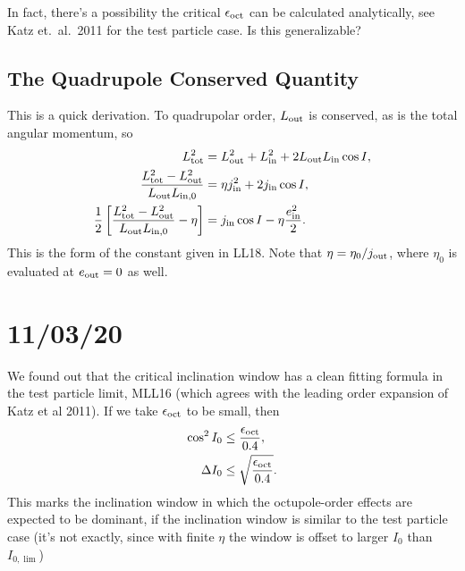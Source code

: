 \documentclass[10pt]{article}%
\newcommand*{\s}[1]{\left[#1\right]}
\begin{document}
In fact, there's a possibility the critical $\epsilon_{\rm oct}$ can be
calculated analytically, see Katz et.\ al.\ 2011 for the test particle case. Is
this generalizable?

\subsection{The Quadrupole Conserved Quantity}

This is a quick derivation. To quadrupolar order, $L_{\rm out}$ is conserved, as
is the total angular momentum, so
\begin{align}
    L_{\rm tot}^2 &= L_{\rm out}^2 + L_{\rm in}^2 + 2L_{\rm out}L_{\rm in}
            \cos I,\\
    \frac{L_{\rm tot}^2 - L_{\rm out}^2}{L_{\rm out}L_{\rm in, 0}} &=
        \eta j_{\rm in}^2 + 2j_{\rm in}\cos I,\\
    \frac{1}{2}\s{\frac{L_{\rm tot}^2 - L_{\rm out}^2}{L_{\rm out}L_{\rm in, 0}}
        - \eta} &= j_{\rm in}\cos I - \eta \frac{e_{\rm in}^2}{2}.
\end{align}
This is the form of the constant given in LL18. Note that $\eta = \eta_0 /
j_{\rm out}$, where $\eta_0$ is evaluated at $e_{\rm out} = 0$ as well.

\section{11/03/20}

We found out that the critical inclination window has a clean fitting formula in
the test particle limit, MLL16 (which agrees with the leading order expansion of
Katz et al 2011). If we take $\epsilon_{\rm oct}$ to be small, then
\begin{align}
    \cos^2 I_0 &\leq \frac{\epsilon_{\rm oct}}{0.4},\\
    \Delta I_0 &\leq \sqrt{\frac{\epsilon_{\rm oct}}{0.4}}.
\end{align}
This marks the inclination window in which the octupole-order effects are
expected to be dominant, if the inclination window is similar to the test
particle case (it's not exactly, since with finite $\eta$ the window is offset
to larger $I_0$ than $I_{0, \lim}$)
\end{document}
